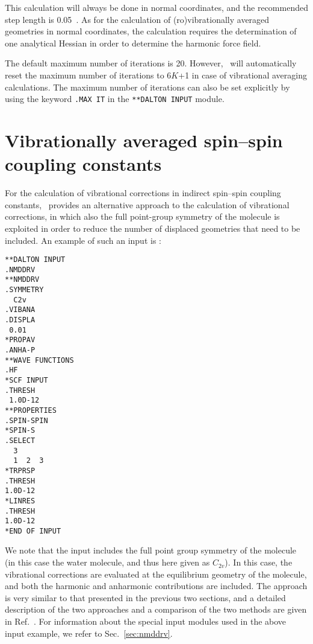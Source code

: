 This calculation will always be done in normal coordinates, and the
recommended step length is 0.05~\cite{krpoaprtjcp112}. As for the calculation of
(ro)vibrationally averaged geometries in normal coordinates, the
calculation requires the determination of one analytical Hessian in
order to determine the harmonic force field.


The default maximum number of iterations is 20. However, \dalton\ will
automatically reset the maximum number of iterations to 6$K$+1 in case
of vibrational averaging calculations. The maximum number of
iterations can also be set explicitly by using
the keyword \verb|.MAX IT| in the \verb|**DALTON INPUT| module.

\section{Vibrationally averaged spin--spin coupling constants}

For the calculation of vibrational corrections in indirect spin--spin
coupling constants, \dalton\ provides an alternative approach to the
calculation of vibrational corrections, in which also the full
point-group symmetry of the molecule is exploited in order to
reduce the number of displaced geometries that need to be included. An
example of such an input is :

\begin{verbatim}
**DALTON INPUT
.NMDDRV
**NMDDRV
.SYMMETRY
  C2v
.VIBANA
.DISPLA
 0.01
*PROPAV
.ANHA-P
**WAVE FUNCTIONS
.HF
*SCF INPUT
.THRESH
 1.0D-12
**PROPERTIES
.SPIN-SPIN
*SPIN-S
.SELECT
  3
  1  2  3
*TRPRSP
.THRESH
1.0D-12
*LINRES
.THRESH
1.0D-12
*END OF INPUT
\end{verbatim}

We note that the input includes the full point group symmetry of the
molecule (in this case the water molecule, and thus here given as
$C_{2v}$). In this case, the vibrational corrections are evaluated at
the equilibrium geometry of the molecule, and both the harmonic and
anharmonic contributions are included. The approach is very similar to
that presented in the previous two sections, and a detailed
description of the two approaches and a comparison of the two methods
are given in Ref.~\cite{tarkr}. For information about the special input
modules used in the above input example, we refer to
Sec.~\ref{sec:nmddrv}. 
